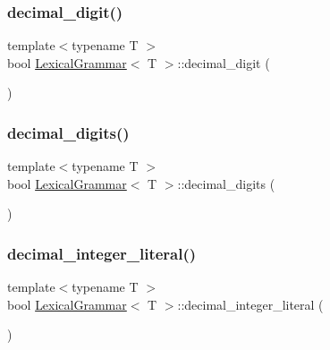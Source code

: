 \mbox{\label{class_lexical_grammar_a013dbcda735a0c6c61970de8bd65c0fe}} 
\subsubsection{\texorpdfstring{decimal\+\_\+digit()}{decimal\_digit()}}
{\footnotesize\ttfamily template$<$typename T $>$ \\
bool \hyperlink{class_lexical_grammar}{Lexical\+Grammar}$<$ T $>$\+::decimal\+\_\+digit (\begin{DoxyParamCaption}{ }\end{DoxyParamCaption})\hspace{0.3cm}{\ttfamily [inline]}}

\mbox{\label{class_lexical_grammar_a434f04e5a69d078a98dcf9163835dad0}} 
\subsubsection{\texorpdfstring{decimal\+\_\+digits()}{decimal\_digits()}}
{\footnotesize\ttfamily template$<$typename T $>$ \\
bool \hyperlink{class_lexical_grammar}{Lexical\+Grammar}$<$ T $>$\+::decimal\+\_\+digits (\begin{DoxyParamCaption}{ }\end{DoxyParamCaption})\hspace{0.3cm}{\ttfamily [inline]}}

\mbox{\label{class_lexical_grammar_afb8b57c8a9457981b9d99704ee78c066}} 
\subsubsection{\texorpdfstring{decimal\+\_\+integer\+\_\+literal()}{decimal\_integer\_literal()}}
{\footnotesize\ttfamily template$<$typename T $>$ \\
bool \hyperlink{class_lexical_grammar}{Lexical\+Grammar}$<$ T $>$\+::decimal\+\_\+integer\+\_\+literal (\begin{DoxyParamCaption}{ }\end{DoxyParamCaption})\hspace{0.3cm}{\ttfamily [inline]}}

